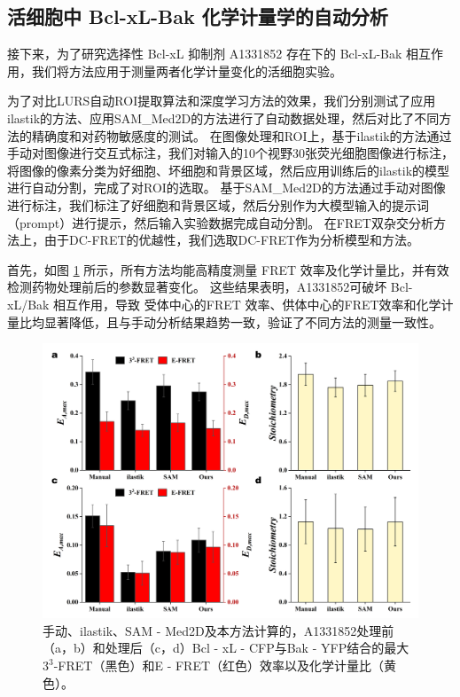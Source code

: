 \subsection{活细胞中 Bcl-xL-Bak 化学计量学的自动分析}

接下来，为了研究选择性 Bcl-xL 抑制剂 A1331852  存在下的 Bcl-xL-Bak 相互作用，我们将方法应用于测量两者化学计量变化的活细胞实验。

为了对比LURS自动ROI提取算法和深度学习方法的效果，我们分别测试了应用ilastik的方法、应用SAM\_Med2D的方法进行了自动数据处理，然后对比了不同方法的精确度和对药物敏感度的测试。
在图像处理和ROI上，基于ilastik的方法通过手动对图像进行交互式标注，我们对输入的10个视野30张荧光细胞图像进行标注，将图像的像素分类为好细胞、坏细胞和背景区域，然后应用训练后的ilastik的模型进行自动分割，完成了对ROI的选取。
基于SAM\_Med2D的方法通过手动对图像进行标注，我们标注了好细胞和背景区域，然后分别作为大模型输入的提示词（prompt）进行提示，然后输入实验数据完成自动分割。
在FRET双杂交分析方法上，由于DC-FRET的优越性，我们选取DC-FRET作为分析模型和方法。

首先，如图 \ref {fig3} 所示，所有方法均能高精度测量 FRET 效率及化学计量比，并有效检测药物处理前后的参数显著变化。
这些结果表明，A1331852可破坏 Bcl-xL/Bak 相互作用，导致 受体中心的FRET 效率、供体中心的FRET效率和化学计量比均显著降低，且与手动分析结果趋势一致，验证了不同方法的测量一致性。

\begin{figure}[!htb]
  \centering
  \includegraphics[width=1\linewidth]{../figures/4/4_方法对比.png}
  \caption{手动、ilastik、SAM - Med2D及本方法计算的，A1331852处理前（a，b）和处理后（c，d）Bcl - xL - CFP与Bak - YFP结合的最大$3^3$-FRET（黑色）和E - FRET（红色）效率以及化学计量比（黄色）。}\label{fig3}
\end{figure}

